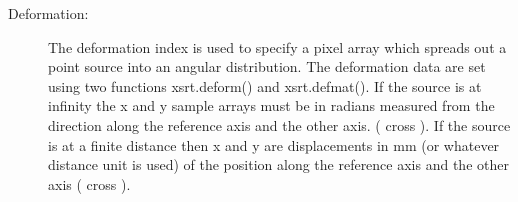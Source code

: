 \documentclass[letterpaper,10pt,english]{sphinxmanual}
\begin{document}
\begin{fulllineitems}
\begin{description}
\item[{Deformation:}] \leavevmode
The deformation index is used to specify a pixel array which spreads
out a point source into an angular distribution. The deformation data are
set using two functions xsrt.deform() and xsrt.defmat().
If the source is at infinity the x and y sample arrays must be in radians
measured from the direction  along the reference axis  and the
other axis.  ( cross ).
If the source is at a finite distance then x and y are displacements
in mm (or whatever distance unit is used) of the position  along
the reference axis  and the other axis ( cross ).

\end{description}

\end{fulllineitems}

\end{document}
